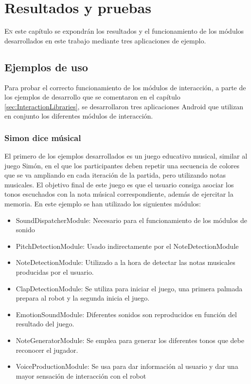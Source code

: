 \chapter{Resultados y pruebas}
\label{chap:results}
\vspace{0.5cm}


 
\lettrine{E}{n} este capítulo se expondrán los resultados y el funcionamiento de los módulos desarrollados en este trabajo mediante tres aplicaciones de ejemplo.
\section{Ejemplos de uso}
Para probar el correcto funcionamiento de los módulos de interacción, a parte de los ejemplos de desarrollo que se comentaron en el capítulo \ref{sec:InteractionLibraries}, se desarrollaron tres aplicaciones Android que utilizan en conjunto los diferentes módulos de interacción.

\subsection{Simon dice músical}
El primero de los ejemplos desarrollados es un juego educativo musical, similar al juego Simón, en el que los participantes deben repetir una secuencia de colores que se va ampliando en cada iteración de la partida, pero utilizando notas musicales. El objetivo final de este juego es que el usuario consiga asociar los tonos escuchados con la nota músical correspondiente, además de ejercitar la memoria.
En este ejemplo se han utilizado los siguientes módulos:

\begin{itemize}
	\item SoundDispatcherModule: Necesario para el funcionamiento de los módulos de sonido
	\item PitchDetectionModule: Usado indirectamente por el NoteDetectionModule
	\item NoteDetectionModule: Utilizado a la hora de detectar las notas musicales producidas por el usuario.
	\item ClapDetectionModule: Se utiliza para iniciar el juego, una primera palmada prepara al robot y la segunda inicia el juego.
	\item EmotionSoundModule: Diferentes sonidos son reproducidos en función del resultado del juego.
	\item NoteGeneratorModule: Se emplea para generar los diferentes tonos que debe reconocer el jugador.
	\item VoiceProductionModule: Se usa para dar información al usuario y dar una mayor sensación de interacción con el robot
\end{itemize}

